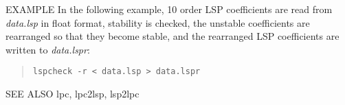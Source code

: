 \begin{options}
\end{options}

\begin{qsection}{EXAMPLE}
In the following example, 10 order LSP coefficients are
read from {\em data.lsp} in float format,
stability is checked, the unstable coefficients are rearranged
so that they become stable, and the rearranged LSP coefficients
are written to {\em data.lspr}:
\begin{quote}
\verb!lspcheck -r < data.lsp > data.lspr!
\end{quote}
\end{qsection}

\begin{qsection}{SEE ALSO}
 lpc, lpc2lsp, lsp2lpc
\end{qsection}
